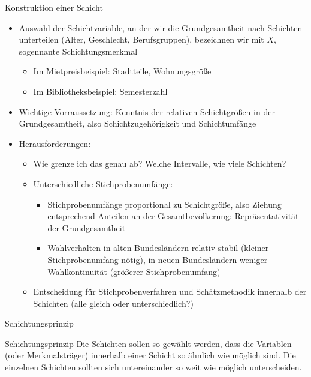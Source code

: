 \documentclass[9pt]{beamer}
\begin{document}
\begin{frame}{Konstruktion einer Schicht}
\begin{itemize}
	\item Auswahl der Schichtvariable, an der wir die Grundgesamtheit nach Schichten unterteilen (Alter, Geschlecht, Berufsgruppen), bezeichnen wir mit $X$, sogennante Schichtungsmerkmal
	\begin{itemize}
		\item Im Mietpreisbeispiel: Stadtteile, Wohnungsgröße
		\item Im Bibliotheksbeispiel: Semesterzahl
	\end{itemize}
	\item Wichtige Vorraussetzung: Kenntnis der relativen Schichtgrößen in der Grundgesamtheit, also Schichtzugehörigkeit und Schichtumfänge
	\item Herausforderungen:
	\begin{itemize}
    \item Wie grenze ich das genau ab? Welche Intervalle, wie viele Schichten?
    \item Unterschiedliche Stichprobenumfänge:
    \begin{itemize}
    	\item Stichprobenumfänge proportional zu Schichtgröße, also Ziehung entsprechend Anteilen an der Gesamtbevölkerung: Repräsentativität der Grundgesamtheit
    	\item Wahlverhalten in alten Bundesländern relativ stabil (kleiner Stichprobenumfang nötig), in neuen Bundesländern weniger Wahlkontinuität (größerer Stichprobenumfang)
    \end{itemize}
   	\item Entscheidung für Stichprobenverfahren und Schätzmethodik innerhalb der Schichten (alle gleich oder unterschiedlich?)

	\end{itemize}	
\end{itemize}
\end{frame}

\begin{frame}{Schichtungsprinzip}
\begin{block}{Schichtungsprinzip}
	Die Schichten sollen so gewählt werden, dass die Variablen (oder Merkmalsträger) innerhalb einer Schicht so ähnlich wie möglich sind. Die einzelnen Schichten sollten sich untereinander so weit wie möglich unterscheiden.
\end{block}
\end{frame}
\end{document}
